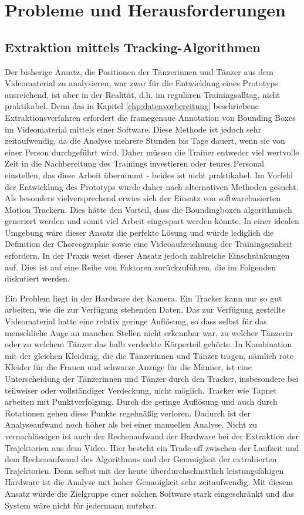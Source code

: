 \documentclass[
  ngerman,
  a4paper,  %
  twoside,  %
  bibliography=totoc,
  headsepline,
  cleardoublepage=empty,
  parskip=half,
  draft=false
]{scrbook}
\begin{document}
\chapter{Probleme und Herausforderungen}
\section{Extraktion mittels Tracking-Algorithmen}
Der bisherige Ansatz, die Positionen der Tänzerinnen und Tänzer aus dem Videomaterial zu analysieren, war zwar für die Entwicklung eines Prototyps ausreichend, ist aber in der Realität, d.h. im regulären Trainingsalltag, nicht praktikabel. Denn das in Kapitel \ref{chp:datenvorbereitung} beschriebene Extraktionsverfahren erfordert die framegenaue Annotation von Bounding Boxes im Videomaterial mittels einer Software. Diese Methode ist jedoch sehr zeitaufwendig, da die Analyse mehrere Stunden bis Tage dauert, wenn sie von einer Person durchgeführt wird. Daher müssen die Trainer entweder viel wertvolle Zeit in die Nachbereitung des Trainings investieren oder teures Personal einstellen, das diese Arbeit übernimmt - beides ist nicht praktikabel.
Im Vorfeld der Entwicklung des Prototyps wurde daher nach alternativen Methoden gesucht. Als besonders vielversprechend erwies sich der Einsatz von softwarebasierten Motion Trackern. Dies hätte den Vorteil, dass die Boundingboxen algorithmisch generiert werden und somit viel Arbeit eingespart werden könnte. In einer idealen Umgebung wäre dieser Ansatz die perfekte Lösung und würde lediglich die Definition der Choreographie sowie eine Videoaufzeichnung der Trainingseinheit erfordern. In der Praxis weist dieser Ansatz jedoch zahlreiche Einschränkungen auf. Dies ist auf eine Reihe von Faktoren zurückzuführen, die im Folgenden diskutiert werden.

Ein Problem liegt in der Hardware der Kamera. Ein Tracker kann nur so gut arbeiten, wie die zur Verfügung stehenden Daten. Das zur Verfügung gestellte Videomaterial hatte eine relativ geringe Auflösung, so dass selbst für das menschliche Auge an manchen Stellen nicht erkennbar war, zu welcher Tänzerin oder zu welchem Tänzer das halb verdeckte Körperteil gehörte. In Kombination mit der gleichen Kleidung, die die Tänzerinnen und Tänzer tragen, nämlich rote Kleider für die Frauen und schwarze Anzüge für die Männer, ist eine Unterscheidung der Tänzerinnen und Tänzer durch den Tracker, insbesondere bei teilweiser oder vollständiger Verdeckung, nicht möglich. Tracker wie Tapnet arbeiten mit Punktverfolgung. Durch die geringe Auflösung und auch durch Rotationen gehen diese Punkte regelmäßig verloren. Dadurch ist der Analyseaufwand noch höher als bei einer manuellen Analyse. Nicht zu vernachlässigen ist auch der Rechenaufwand der Hardware bei der Extraktion der Trajektorien aus dem Video. Hier besteht ein Trade-off zwischen der Laufzeit und dem Rechenaufwand des Algorithmus und der Genauigkeit der extrahierten Trajektorien. Denn selbst mit der heute überdurchschnittlich leistungsfähigen Hardware ist die Analyse mit hoher Genauigkeit sehr zeitaufwendig. Mit diesem Ansatz würde die Zielgruppe einer solchen Software stark eingeschränkt und das System wäre nicht für jedermann nutzbar.
\end{document}
